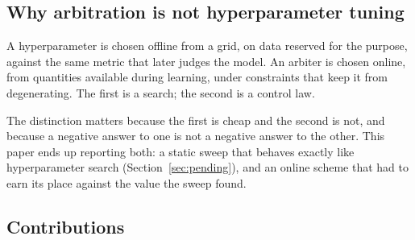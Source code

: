 \documentclass[11pt]{article}
\begin{document}
\subsection{Why arbitration is not hyperparameter tuning}

A hyperparameter is chosen offline from a grid, on data reserved for the purpose, against the same
metric that later judges the model. An arbiter is chosen online, from quantities available during
learning, under constraints that keep it from degenerating. The first is a search; the second is a
control law.

The distinction matters because the first is cheap and the second is not, and because a negative
answer to one is not a negative answer to the other. This paper ends up reporting both: a static
sweep that behaves exactly like hyperparameter search (Section~\ref{sec:pending}), and an online
scheme that had to earn its place against the value the sweep found.

\subsection{Contributions}
\end{document}
